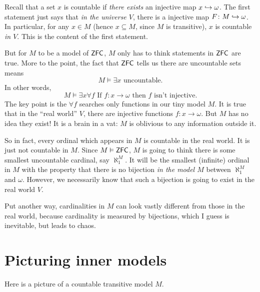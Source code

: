 Recall that a set $x$ is countable if
\emph{there exists} an injective map $x \hookrightarrow \omega$.
The first statement just says that \emph{in the universe $V$},
there is a injective map $F \colon M \hookrightarrow \omega$.
In particular, for any $x \in M$ (hence $x \subseteq M$, since $M$ is transitive),
$x$ is countable \emph{in $V$}.
This is the content of the first statement.

But for $M$ to be a model of $\mathsf{ZFC}$, $M$ only has to think statements in $\mathsf{ZFC}$ are true.
More to the point, the fact that $\mathsf{ZFC}$ tells us there are uncountable sets means
\[ M \vDash \text{$\exists x$ uncountable}. \]
In other words,
\[ M \vDash \exists x \forall f
	\text{ If $f \colon x \to \omega$ then $f$ isn't injective}. \]
The key point is the $\forall f$ searches only functions in our tiny model $M$.
It is true that in the ``real world'' $V$, there are injective functions $f \colon x \to \omega$.
But $M$ has no idea they exist!
It is a brain in a vat: $M$ is oblivious to any information outside it.

So in fact, every ordinal which appears in $M$ is countable in the real world.
It is just not countable in $M$.
Since $M \vDash \mathsf{ZFC}$, $M$ is going to think there is some smallest uncountable cardinal,
say $\aleph_1^M$.
It will be the smallest (infinite) ordinal in $M$
with the property that there is no bijection \emph{in the model $M$}
between $\aleph_1^M$ and $\omega$.
However, we necessarily know that such a bijection is going to exist in the real world $V$.

Put another way, cardinalities in $M$ can look vastly different from those in the real world,
because cardinality is measured by bijections, which I guess is inevitable, but leads to chaos.

\section{Picturing inner models}
Here is a picture of a countable transitive model $M$.

